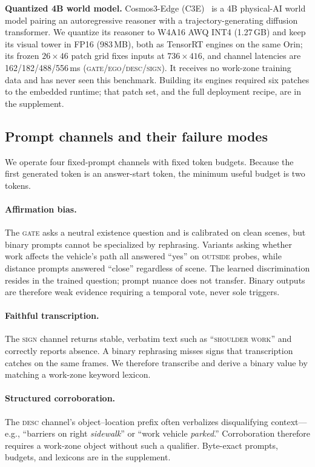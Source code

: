 \documentclass[journal]{IEEEtran}
\begin{document}
\textbf{Quantized 4B world model.}  Cosmos3-Edge (C3E)~\cite{nvidia2026cosmos3} is a 4B physical-AI world model pairing an autoregressive reasoner with a trajectory-generating diffusion transformer.  We quantize its reasoner to W4A16 AWQ INT4 (1.27\,GB) and keep its visual tower in FP16 (983\,MB), both as TensorRT engines on the same Orin; its frozen $26{\times}46$ patch grid fixes inputs at $736{\times}416$, and channel latencies are 162/182/488/556\,ms (\textsc{gate}/\textsc{ego}/\textsc{desc}/\textsc{sign}).  It receives no work-zone training data and has never seen this benchmark.  Building its engines required six patches to the embedded runtime; that patch set, and the full deployment recipe, are in the supplement.

\subsection{Prompt channels and their failure modes}
\label{sec:prompts}

We operate four fixed-prompt channels with fixed token budgets.  Because the first generated token is an answer-start token, the minimum useful budget is two tokens.


\paragraph{Affirmation bias.} The \textsc{gate} asks a neutral existence question and is calibrated on clean scenes, but binary prompts cannot be specialized by rephrasing.  Variants asking whether work affects the vehicle's path all answered ``yes'' on \textsc{outside} probes, while distance prompts answered ``close'' regardless of scene.  The learned discrimination resides in the trained question; prompt nuance does not transfer.  Binary outputs are therefore weak evidence requiring a temporal vote, never sole triggers.

\paragraph{Faithful transcription.} The \textsc{sign} channel returns stable, verbatim text such as ``\textsc{shoulder work}'' and correctly reports absence.  A binary rephrasing misses signs that transcription catches on the same frames.  We therefore transcribe and derive a binary value by matching a work-zone keyword lexicon.

\paragraph{Structured corroboration.} The \textsc{desc} channel's object--location prefix often verbalizes disqualifying context---e.g., ``barriers on right \emph{sidewalk}'' or ``work vehicle \emph{parked}.''  Corroboration therefore requires a work-zone object without such a qualifier.  Byte-exact prompts, budgets, and lexicons are in the supplement.
\end{document}
